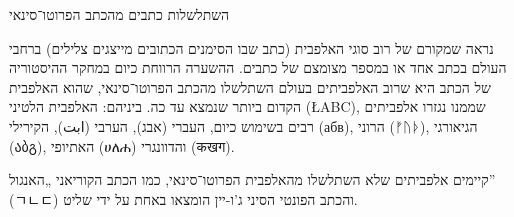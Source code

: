 השתלשלות כתבים מהכתב הפרוטו־סינאי

נראה שמקורם של רוב סוגי האלפבית (כתב שבו הסימנים הכתובים מייצגים צלילים) ברחבי העולם בכתב אחד או במספר מצומצם של כתבים. ההשערה הרווחת כיום במחקר ההיסטוריה של הכתב היא שרוב האלפביתים בעולם השתלשלו מהכתב הפרוטו־סינאי, שהוא האלפבית הקדום ביותר שנמצא עד כה. ביניהם: האלפבית הלטיני (\L{ABC}), שממנו נגזרו אלפביתים רבים בשימוש כיום, העברי (אבג), הערבי (ابت), הקירילי (абв), הרוני (ᚠᚢᚦ), הגיאורגי (აბგ), האתיופי (ሀለሐ) והדוונגרי (कखग).

קיימים אלפביתים שלא השתלשלו מהאלפבית הפרוטו־סינאי, כמו הכתב הקוריאני „האנגול” (ㄱㄴㄷ) והכתב הפונטי הסיני ג'ו-יין הומצאו באחת על ידי שליט.

